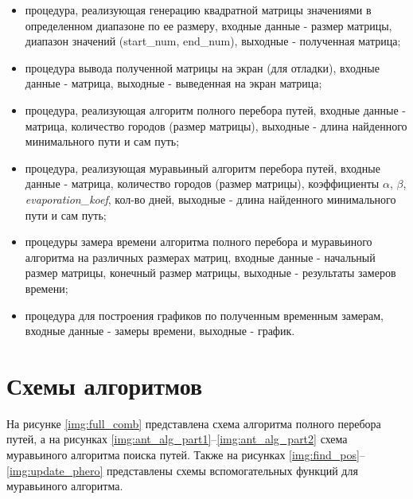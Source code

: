 \begin{itemize}
	\item процедура, реализующая генерацию квадратной матрицы значениями в определенном диапазоне по ее размеру, входные данные - размер матрицы, диапазон значений (start\_num, end\_num), выходные - полученная матрица;
	\item процедура вывода полученной матрицы на экран (для отладки), входные данные - матрица, выходные - выведенная на экран матрица;
	\item процедура, реализующая алгоритм полного перебора путей, входные данные - матрица, количество городов (размер матрицы), выходные - длина найденного минимального пути и сам путь;
	\item процедура, реализующая муравьиный алгоритм перебора путей, входные данные - матрица, количество городов (размер матрицы), коэффициенты $\alpha$, $\beta$, \textit{evaporation\_koef}, кол-во дней, выходные - длина найденного минимального пути и сам путь;
	\item процедуры замера времени алгоритма полного перебора и муравьиного алгоритма на различных размерах матриц, входные данные - начальный размер матрицы, конечный размер матрицы, выходные - результаты замеров времени;
	\item процедура для построения графиков по полученным временным замерам, входные данные - замеры времени, выходные - график. 
\end{itemize}


\section{Схемы алгоритмов}
На рисунке \ref{img:full_comb} представлена схема алгоритма полного перебора путей, а на рисунках \ref{img:ant_alg_part1}--\ref{img:ant_alg_part2} схема муравьиного алгоритма поиска путей. Также на рисунках \ref{img:find_pos}--\ref{img:update_phero} представлены схемы вспомогательных функций для муравьиного алгоритма.


